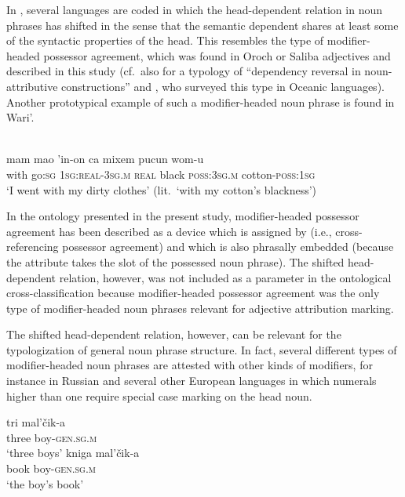 In , several languages are coded in which the head-dependent relation in noun phrases has shifted in the sense that the semantic dependent shares at least some of the syntactic properties of the head. This resembles the type of modifier\hyp{}headed possessor agreement, which was found in Oroch or Saliba adjectives and described in this study (cf.~also \citealt{malchukov2000} for a typology of “dependency reversal in noun-attributive constructions” and \citealt{ross1998}, who surveyed this type in Oceanic languages). Another prototypical example of such a modifier\hyp{}headed noun phrase is found in Wari'.
\begin{exe}
\ex
\label{ex1}
\\
  \gll	mam mao 'in-on		ca	    mixem  pucun	wom-u\\
  	with  go:\textsc{sg}  \textsc{1sg:real-3sg.m}	\textsc{real}  black    \textsc{poss:3sg.m}	cotton-\textsc{poss:1sg}\\
  \glt ‘I went with my dirty clothes’ (lit.~‘with my cotton's blackness’)
\end{exe}

In the ontology presented in the present study, modifier\hyp{}headed possessor agreement has been described as a device which is assigned by  (i.e., cross-referencing possessor agreement) and which is also phrasally embedded (because the attribute takes the slot of the possessed noun phrase). The shifted head-dependent relation, however, was not included as a parameter in the ontological cross-classification because modifier\hyp{}headed possessor agreement was the only type of modifier\hyp{}headed noun phrases relevant for adjective attribution marking.

The shifted head-dependent relation, however, can be relevant for the typologization of general noun phrase structure. In fact, several different types of modifier\hyp{}headed noun phrases are attested with other kinds of modifiers, for instance in Russian and several other European languages in which numerals higher than one require special case marking on the head noun.
\begin{exe}
\ex
\label{russianheadstand}
\begin{xlist}
\ex
\label{rushead}
\gll tri mal'čik-a\\
  	three		boy-\textsc{gen.sg.m}\\
  \glt ‘three boys’
\ex
\label{rusgen}
  \gll	kniga mal'čik-a\\
  	book	 boy-\textsc{gen.sg.m}\\
  \trans ‘the boy's book’
\end{xlist}
\end{exe}

